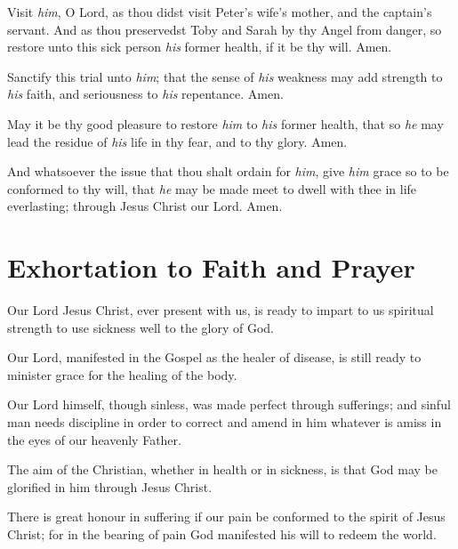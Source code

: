 Visit \emph{him}, O Lord, as thou didst visit Peter’s wife’s mother, and the captain’s servant. And as thou preservedst Toby and Sarah by thy Angel from danger, so restore unto this sick person \emph{his} former health, if it be thy will.  \R Amen.
\smallskip

Sanctify this trial unto \emph{him}; that the sense of \emph{his} weakness may add strength to \emph{his} faith, and seriousness to \emph{his} repentance. \R Amen.

\smallskip

May it be thy good pleasure to restore \emph{him} to \emph{his} former health, that so \emph{he} may lead the residue of \emph{his} life in thy fear, and to thy glory. \R Amen.

\smallskip

And whatsoever the issue that thou shalt ordain for \emph{him}, give \emph{him} grace so to be conformed to thy will, that \emph{he} may be made meet to dwell with thee in life everlasting; through Jesus Christ our Lord. \R Amen.

\section{Exhortation to Faith and Prayer}

{\centering{}}


Our Lord Jesus Christ, ever present with us, is ready to impart to us spiritual strength to use sickness well to the glory of God.

Our Lord, manifested in the Gospel as the healer of disease, is still ready to minister grace for the healing of the body.

Our Lord himself, though sinless, was made perfect through sufferings; and sinful man needs discipline in order to correct and amend in him whatever is amiss in the eyes of our heavenly Father.

The aim of the Christian, whether in health or in sickness, is that God may be glorified in him through Jesus Christ.

There is great honour in suffering if our pain be conformed to the spirit of Jesus Christ; for in the bearing of pain God manifested his will to redeem the world.

